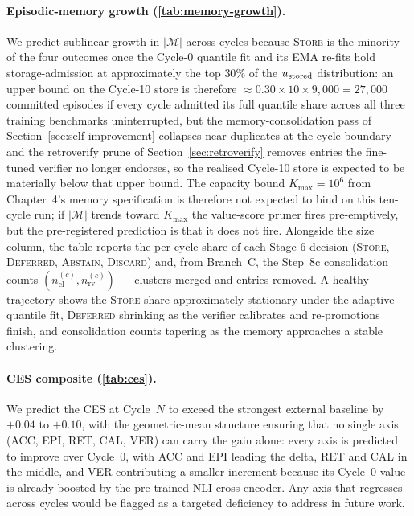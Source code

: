 \paragraph{Episodic-memory growth (\cref{tab:memory-growth}).}
We predict sublinear growth in $|\mathcal{M}|$ across cycles because \textsc{Store} is the minority of the four outcomes once the Cycle-0 quantile fit and its EMA re-fits hold storage-admission at approximately the top $30\%$ of the $u_{\text{stored}}$ distribution: an upper bound on the Cycle-10 store is therefore $\approx 0.30 \times 10 \times 9{,}000 = 27{,}000$ committed episodes if every cycle admitted its full quantile share across all three training benchmarks uninterrupted, but the memory-consolidation pass of Section~\ref{sec:self-improvement} collapses near-duplicates at the cycle boundary and the retroverify prune of Section~\ref{sec:retroverify} removes entries the fine-tuned verifier no longer endorses, so the realised Cycle-10 store is expected to be materially below that upper bound. The capacity bound $K_{\max} = 10^{6}$ from Chapter~4's memory specification is therefore not expected to bind on this ten-cycle run; if $|\mathcal{M}|$ trends toward $K_{\max}$ the value-score pruner fires pre-emptively, but the pre-registered prediction is that it does not fire. Alongside the size column, the table reports the per-cycle share of each Stage-6 decision (\textsc{Store}, \textsc{Deferred}, \textsc{Abstain}, \textsc{Discard}) and, from Branch~C, the Step~8c consolidation counts $(n_{\text{cl}}^{(c)}, n_{\text{rv}}^{(c)})$ --- clusters merged and entries removed. A healthy trajectory shows the \textsc{Store} share approximately stationary under the adaptive quantile fit, \textsc{Deferred} shrinking as the verifier calibrates and re-promotions finish, and consolidation counts tapering as the memory approaches a stable clustering.

\paragraph{CES composite (\cref{tab:ces}).}
We predict the CES at Cycle~$N$ to exceed the strongest external
baseline by $+0.04$ to $+0.10$, with the geometric-mean structure
ensuring that no single axis (ACC, EPI, RET, CAL, VER) can carry the
gain alone: every axis is predicted to improve over Cycle~$0$, with
ACC and EPI leading the delta, RET and CAL in the middle, and VER
contributing a smaller increment because its Cycle~$0$ value is
already boosted by the pre-trained NLI cross-encoder. Any axis that
regresses across cycles would be flagged as a targeted deficiency to
address in future work.

